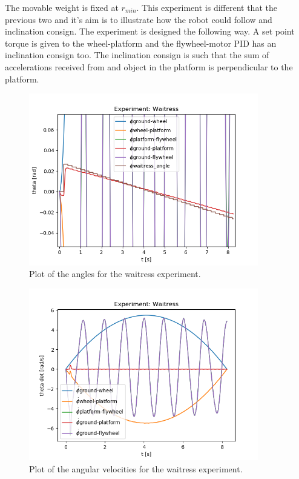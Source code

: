 \begin{enumerate}
	The movable weight is fixed at $r_{min}$. This experiment is different that the previous two and it's aim is to illustrate
		  how the robot could follow and inclination consign. The experiment is designed
		  the following way. A set point torque is given to the wheel-platform and the
		  flywheel-motor PID has an inclination consign too. The inclination consign is such
		  that the sum of accelerations received from and object in the platform is perpendicular
		  to the platform. 



	      \begin{figure}[H]
		      \centering
		      \includegraphics[width=10cm]{img/lagrange_5/waitress_q_zoom.png}
		      \caption{Plot of the angles for the waitress experiment.}
		      \label{fig:Simulation pendulum q}
	      \end{figure}


	      \begin{figure}[H]
		      \centering
		      \includegraphics[width=10cm]{img/lagrange_5/waitress_q_dot.png}
		      \caption{Plot of the angular velocities for the waitress experiment.}
		      \label{fig:Simulation pendulum q dot}
	      \end{figure}

\end{enumerate}
